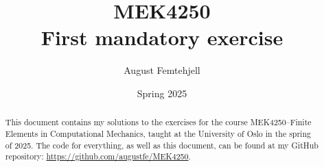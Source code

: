 \documentclass[a4paper,12pt]{article}
\title{
    MEK4250\\
    \small{First mandatory exercise}
}
\author{August Femtehjell}
\date{Spring 2025}
\theoremstyle{exerciseStyle}
\theoremstyle{solutionStyle}
\numberwithin{equation}{solutionTemp}
\begin{document}
\maketitle

\tableofcontents

\begin{abstract}
    This document contains my solutions to the exercises for the course MEK4250--Finite Elements in Computational Mechanics, taught at the University of Oslo in the spring of 2025.
    The code for everything, as well as this document, can be found at my GitHub repository: \url{https://github.com/augustfe/MEK4250}.
\end{abstract}


\end{document}
